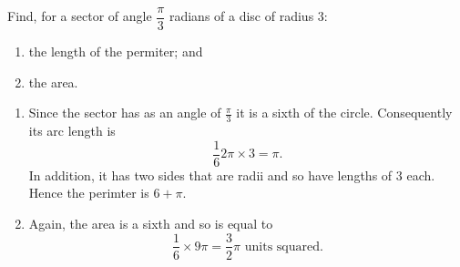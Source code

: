 Find, for a sector of angle $\dfrac{\pi}{3}$ radians of a disc of radius 3:
\begin{enumerate}
\item the length of the permiter; and \item the area.
\end{enumerate}
\begin{enumerate}
\item
Since the sector has as an angle of $\frac{\pi}{3}$ it is a sixth of the circle. Consequently its arc length is
\[
\frac{1}{6}2\pi\times 3 = \pi.
\]
In addition, it has two sides that are radii and so have lengths of 3 each. Hence the perimter is $6 + \pi$.
\item 
Again, the area is a sixth and so is equal to
\[
\frac{1}{6}\times 9 \pi = \frac{3}{2}\pi \text{ units squared}.
\]
\end{enumerate}